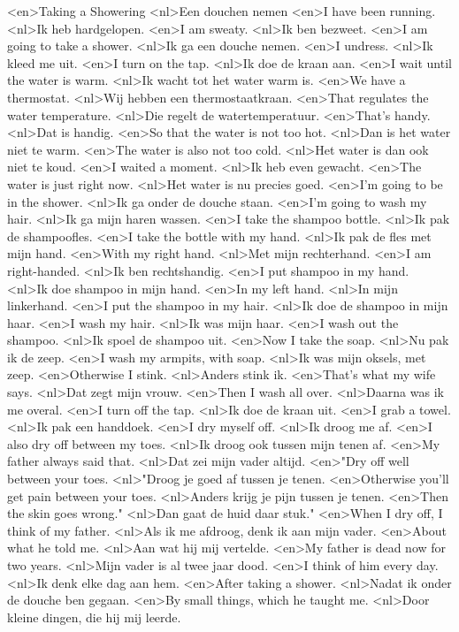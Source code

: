 <en>Taking a Showering
<nl>Een douchen nemen
<en>I have been running.
<nl>Ik heb hardgelopen.
<en>I am sweaty.
<nl>Ik ben bezweet.
<en>I am going to take a shower.
<nl>Ik ga een douche nemen.
<en>I undress.
<nl>Ik kleed me uit.
<en>I turn on the tap.
<nl>Ik doe de kraan aan.
<en>I wait until the water is warm.
<nl>Ik wacht tot het water warm is.
<en>We have a thermostat.
<nl>Wij hebben een thermostaatkraan.
<en>That regulates the water temperature.
<nl>Die regelt de watertemperatuur.
<en>That's handy.
<nl>Dat is handig.
<en>So that the water is not too hot.
<nl>Dan is het water niet te warm.
<en>The water is also not too cold.
<nl>Het water is dan ook niet te koud.
<en>I waited a moment.
<nl>Ik heb even gewacht.
<en>The water is just right now.
<nl>Het water is nu precies goed.
<en>I'm going to be in the shower.
<nl>Ik ga onder de douche staan.
<en>I'm going to wash my hair.
<nl>Ik ga mijn haren wassen.
<en>I take the shampoo bottle.
<nl>Ik pak de shampoofles.
<en>I take the bottle with my hand.
<nl>Ik pak de fles met mijn hand.
<en>With my right hand.
<nl>Met mijn rechterhand.
<en>I am right-handed.
<nl>Ik ben rechtshandig.
<en>I put shampoo in my hand.
<nl>Ik doe shampoo in mijn hand.
<en>In my left hand.
<nl>In mijn linkerhand.
<en>I put the shampoo in my hair.
<nl>Ik doe de shampoo in mijn haar.
<en>I wash my hair.
<nl>Ik was mijn haar.
<en>I wash out the shampoo.
<nl>Ik spoel de shampoo uit.
<en>Now I take the soap.
<nl>Nu pak ik de zeep.
<en>I wash my armpits, with soap.
<nl>Ik was mijn oksels, met zeep.
<en>Otherwise I stink.
<nl>Anders stink ik.
<en>That's what my wife says.
<nl>Dat zegt mijn vrouw.
<en>Then I wash all over.
<nl>Daarna was ik me overal.
<en>I turn off the tap.
<nl>Ik doe de kraan uit.
<en>I grab a towel.
<nl>Ik pak een handdoek.
<en>I dry myself off.
<nl>Ik droog me af.
<en>I also dry off between my toes.
<nl>Ik droog ook tussen mijn tenen af.
<en>My father always said that.
<nl>Dat zei mijn vader altijd.
<en>"Dry off well between your toes.
<nl>"Droog je goed af tussen je tenen.
<en>Otherwise you'll get pain between your toes.
<nl>Anders krijg je pijn tussen je tenen.
<en>Then the skin goes wrong."
<nl>Dan gaat de huid daar stuk."
<en>When I dry off, I think of my father.
<nl>Als ik me afdroog, denk ik  aan mijn vader.
<en>About what he told me.
<nl>Aan wat hij mij vertelde.
<en>My father is dead now for two years.
<nl>Mijn vader is al twee jaar dood.
<en>I think of him every day.
<nl>Ik denk elke dag aan hem.
<en>After taking a shower.
<nl>Nadat  ik onder de douche ben gegaan.
<en>By small things, which he taught me.
<nl>Door kleine dingen, die hij mij leerde.
